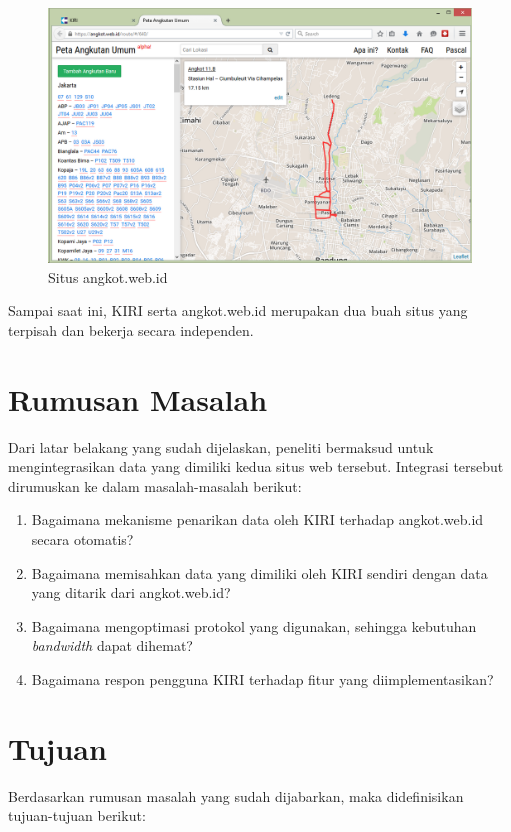 \begin{figure}
	\centering
	\includegraphics[scale=0.5]{Gambar/1_angkotwebid}
	\caption{Situs angkot.web.id}
	\label{fig:1_angkotwebid}
\end{figure}

Sampai saat ini, KIRI serta angkot.web.id merupakan dua buah situs yang terpisah dan bekerja secara independen.

\section{Rumusan Masalah}

Dari latar belakang yang sudah dijelaskan, peneliti bermaksud untuk mengintegrasikan data yang dimiliki kedua situs web tersebut. Integrasi tersebut dirumuskan ke dalam masalah-masalah berikut:

\begin{enumerate}
	\item Bagaimana mekanisme penarikan data oleh KIRI terhadap angkot.web.id secara otomatis?
	\item Bagaimana memisahkan data yang dimiliki oleh KIRI sendiri dengan data yang ditarik dari angkot.web.id?
	\item Bagaimana mengoptimasi protokol yang digunakan, sehingga kebutuhan \textit{bandwidth} dapat dihemat?
	\item Bagaimana respon pengguna KIRI terhadap fitur yang diimplementasikan?
\end{enumerate}

\section{Tujuan}

Berdasarkan rumusan masalah yang sudah dijabarkan, maka didefinisikan tujuan-tujuan berikut:

